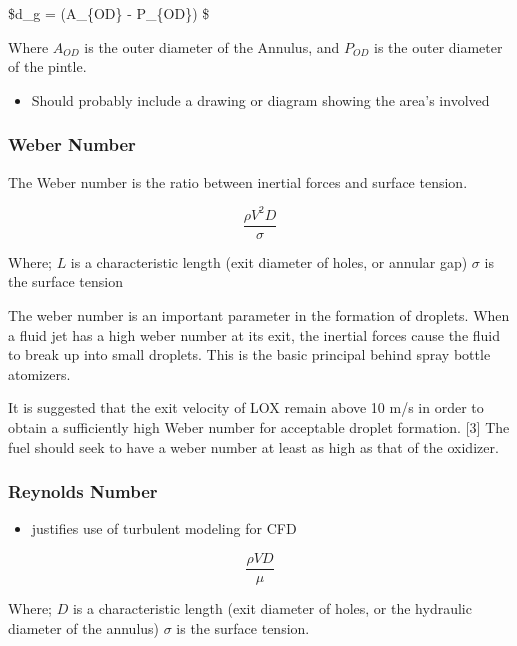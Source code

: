 \documentclass[11pt]{article}
\providecommand{\tightlist}{%
      \setlength{\itemsep}{0pt}\setlength{\parskip}{0pt}}
\begin{document}
\$d\_g = (A\_\{OD\} - P\_\{OD\}) \$

Where \(A_{OD}\) is the outer diameter of the Annulus, and \(P_{OD}\) is
the outer diameter of the pintle.

\begin{itemize}
\tightlist
\item
  Should probably include a drawing or diagram showing the area's
  involved
\end{itemize}

\subsubsection{Weber Number}\label{weber-number}

The Weber number is the ratio between inertial forces and surface
tension.

\begin{equation}
\frac{\rho V^2 D}{\sigma}
\label{eq:Weber}
\tag{12}
\end{equation}

Where; \(L\) is a characteristic length (exit diameter of holes, or
annular gap) \(\sigma\) is the surface tension

The weber number is an important parameter in the formation of droplets.
When a fluid jet has a high weber number at its exit, the inertial
forces cause the fluid to break up into small droplets. This is the
basic principal behind spray bottle atomizers.

It is suggested that the exit velocity of LOX remain above 10 m/s in
order to obtain a sufficiently high Weber number for acceptable droplet
formation. {[}3{]} The fuel should seek to have a weber number at least
as high as that of the oxidizer.

\subsubsection{Reynolds Number}\label{reynolds-number}

\begin{itemize}
\tightlist
\item
  justifies use of turbulent modeling for CFD
\end{itemize}

\begin{equation}
\frac{\rho V D}{\mu}
\label{eq:Reynolds}
\tag{11}
\end{equation}

Where; \(D\) is a characteristic length (exit diameter of holes, or the
hydraulic diameter of the annulus) \(\sigma\) is the surface tension.
\end{document}
